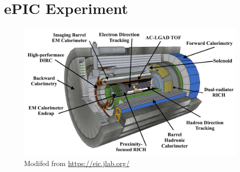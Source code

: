 \chapter{ePIC Experiment}\label{cha:epic} %

\begin{figure}[H]
    \centering
    \includegraphics[width=.9\linewidth]{img/ePIC_skp.png}
    \caption{Modifed from \url{https://eic.jlab.org/}}
    \label{fig:epic:epic}
\end{figure}